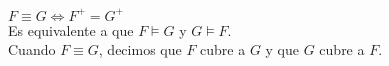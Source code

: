 \documentclass[preview]{standalone}
\begin{document}
$F\equiv G \Longleftrightarrow F^+ = G^+$\\

Es equivalente a que $F\models G$ y $G\models F$.\\

Cuando $F\equiv G$, decimos que $F$ cubre a $G$ y que $G$ cubre a $F$.
\end{document}
